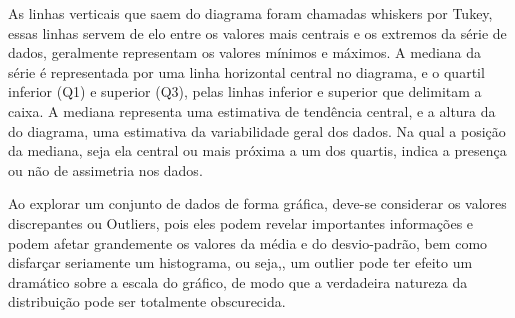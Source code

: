 \begin{figure}[!htb]
\end{figure}

\newpage

\inic As linhas verticais que saem do diagrama foram chamadas whiskers
por Tukey, essas linhas servem de elo entre os valores mais
centrais e os extremos da série de dados, geralmente representam
os valores mínimos e máximos. A mediana da série é representada
por uma linha horizontal central no diagrama, e o quartil inferior
(Q1) e superior (Q3), pelas linhas inferior e superior que
delimitam a caixa. A mediana representa uma estimativa de tendência central, e a altura da do diagrama, uma estimativa da variabilidade geral dos
dados. Na qual a posição da mediana, seja ela central ou mais
próxima a um dos quartis, indica a presença ou não de assimetria
nos dados.\vskip0.3cm

\inic Ao explorar um conjunto de dados de forma gráfica, deve-se considerar os valores discrepantes ou Outliers, pois eles podem revelar importantes informações e podem afetar grandemente os valores da média e do desvio-padrão, bem como disfarçar seriamente um histograma, ou seja,, um outlier pode ter efeito um dramático sobre a escala do gráfico, de modo que a verdadeira natureza da distribuição pode ser totalmente  obscurecida.












